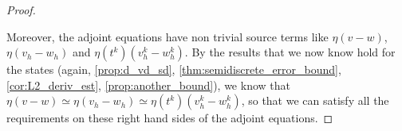 \documentclass[english,a4paper,9pt,oneside]{scrbook}	%
\theoremstyle{break}
\newenvironment{mproof}[1][\proofname]{%
  \begin{proof}[#1]$ $\par\nobreak\ignorespaces
}{%
  \end{proof}
}
\renewcommand*{\proofname}{Proof}
\theoremstyle{remark}
\begin{document}
\begin{mproof}
Moreover, the adjoint equations have non trivial source terms like $\eta(v-w)$, $\eta(v_h-w_h)$ and $\eta(t^k)(v_h^k-w_h^k)$. By the results that we now know hold for the states (again, \cref{prop:d_vd_sd}, \cref{thm:semidiscrete_error_bound}, \cref{cor:L2_deriv_est}, \cref{prop:another_bound}), we know that $\eta(v-w)\simeq\eta(v_h-w_h)\simeq \eta(t^k)(v_h^k-w_h^k)$, so that we can satisfy all the requirements on these right hand sides of the adjoint equations. 
\end{mproof}

%
%
%
%
\end{document}
